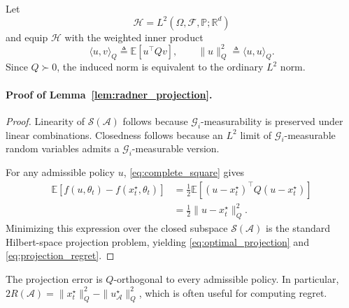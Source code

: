Let
\begin{equation}
    \mathcal{H}
    =
    L^2(
        \Omega,\mathcal{F},\mathbb{P};
        \mathbb{R}^{d}
    )
    \label{eq:hilbert_space}
\end{equation}
and equip $\mathcal{H}$ with the weighted inner product
\begin{equation}
    \langle u,v\rangle_Q
    \triangleq
    \mathbb{E}
    \left[
        u^\top Qv
    \right],
    \qquad
    \|u\|_Q^2
    \triangleq
    \langle u,u\rangle_Q.
    \label{eq:q_inner_product}
\end{equation}
Since $Q\succ0$, the induced norm is equivalent to the ordinary $L^2$ norm.

\paragraph{Proof of Lemma~\ref{lem:radner_projection}.}
\begin{proof}
Linearity of $\mathcal{S}(\mathcal{A})$ follows because
$\mathcal{G}_i$-measurability is preserved under linear combinations.
Closedness follows because an $L^2$ limit of
$\mathcal{G}_i$-measurable random variables admits a
$\mathcal{G}_i$-measurable version.

For any admissible policy $u$, \eqref{eq:complete_square} gives
\begin{align}
    \mathbb{E}
    \left[
        f(u,\theta_t)
        -
        f(x_t^\star,\theta_t)
    \right]
    &=
    \frac{1}{2}
    \mathbb{E}
    \left[
        (u-x_t^\star)^\top
        Q
        (u-x_t^\star)
    \right]
    \nonumber\\
    &=
    \frac{1}{2}
    \|u-x_t^\star\|_Q^2.
    \label{eq:projection_proof}
\end{align}
Minimizing this expression over the closed subspace
$\mathcal{S}(\mathcal{A})$ is the standard Hilbert-space projection problem,
yielding \eqref{eq:optimal_projection} and \eqref{eq:projection_regret}.
\end{proof}

The projection error is $Q$-orthogonal to every admissible policy. In particular,
$2R(\mathcal A)=\|x_t^\star\|_Q^2-\|u_{\mathcal A}^\star\|_Q^2$,
which is often useful for computing regret.

